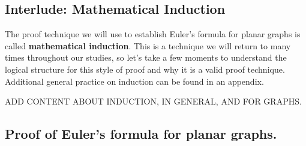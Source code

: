 \documentclass[10pt,]{book}
\newcommand{\terminology}[1]{\textbf{#1}}
\theoremstyle{plain}
\theoremstyle{definition}
\theoremstyle{definition}
\theoremstyle{definition}
\theoremstyle{definition}
\numberwithin{equation}{chapter}
\begin{document}
\subsection[{Interlude: Mathematical Induction}]{Interlude: Mathematical Induction}\label{subsection-4}
\hypertarget{p-202}{}%
The proof technique we will use to establish Euler's formula for planar graphs is called \terminology{mathematical induction}.  This is a technique we will return to many times throughout our studies, so let's take a few moments to understand the logical structure for this style of proof and why it is a valid proof technique.  Additional general practice on induction can be found in an appendix.%
\par
\hypertarget{p-203}{}%
ADD CONTENT ABOUT INDUCTION, IN GENERAL, AND FOR GRAPHS.%
\typeout{************************************************}
\typeout{************************************************}
\subsection[{Proof of Euler's formula for planar graphs.}]{Proof of Euler's formula for planar graphs.}\label{subsection-5}
\typeout{************************************************}
\typeout{************************************************}
\end{document}
